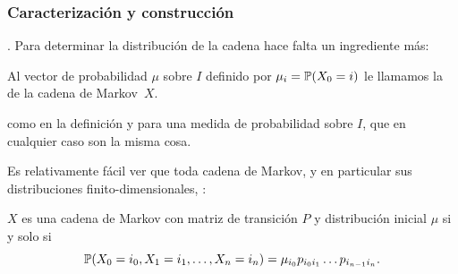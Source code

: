 \subsubsection{Caracterización y construcción}

.
Para determinar la distribución de la cadena hace falta un ingrediente más:

\begin{defn}
Al vector de probabilidad $\mu$ sobre $I$ definido por $\mu_i=\mathbb{P}(X_0=i)$ le llamamos la \emph{} de la cadena de Markov~$X$.
\end{defn}

 como en la definición y para una medida de probabilidad sobre $I$, que en cualquier caso son la misma cosa.

Es relativamente fácil ver que toda cadena de Markov, y en particular sus distribuciones finito-dimensionales, :

\begin{prop}\label{prop:caractMarkov}
$X$ es una cadena de Markov con matriz de transición $P$ y distribución inicial $\mu$ si y solo si
\[\mathbb{P}(X_0=i_0,X_1=i_1,\dotsc,X_n=i_n)=\mu_{i_0}p_{i_0i_1}\dotsc p_{i_{n-1}i_n}.\]
\end{prop}

